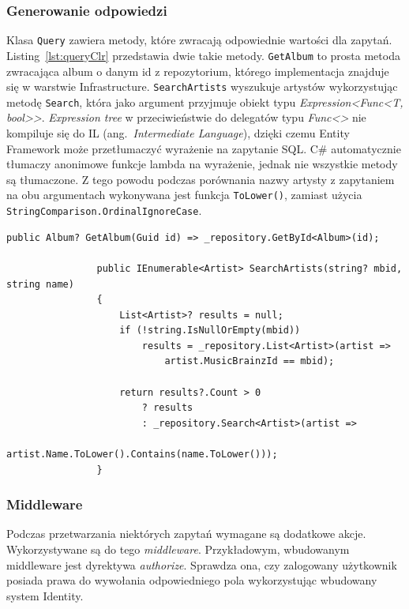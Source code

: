 		\subsubsection*{Generowanie odpowiedzi}
			Klasa \verb|Query| zawiera metody, które zwracają odpowiednie wartości dla zapytań.
			Listing~\ref{lst:queryClr} przedstawia dwie takie metody.
			\verb|GetAlbum| to prosta metoda zwracająca album o danym id z repozytorium, którego implementacja znajduje się w warstwie Infrastructure.
			\verb|SearchArtists| wyszukuje artystów wykorzystując metodę \verb|Search|, która jako argument przyjmuje obiekt typu \emph{Expression<Func<T, bool>>}.
			\emph{Expression tree} w przeciwieństwie do delegatów typu \emph{Func<>} nie kompiluje się do IL (ang.\ \emph{Intermediate Language}),
			dzięki czemu Entity Framework może przetłumaczyć wyrażenie na zapytanie SQL.
			C\# automatycznie tłumaczy anonimowe funkcje lambda na wyrażenie, jednak nie wszystkie metody są tłumaczone.
			Z tego powodu podczas porównania nazwy artysty z zapytaniem na obu argumentach wykonywana jest funkcja \verb|ToLower()|,
			zamiast użycia \verb|StringComparison.OrdinalIgnoreCase|.

			\begin{lstlisting}[label=lst:queryClr, caption=Fragment klasy Query, float=h]
				public Album? GetAlbum(Guid id) => _repository.GetById<Album>(id);

				public IEnumerable<Artist> SearchArtists(string? mbid, string name)
				{
					List<Artist>? results = null;
					if (!string.IsNullOrEmpty(mbid))
						results = _repository.List<Artist>(artist =>
							artist.MusicBrainzId == mbid);
		
					return results?.Count > 0
						? results
						: _repository.Search<Artist>(artist =>
							artist.Name.ToLower().Contains(name.ToLower()));
				}
			\end{lstlisting}

		\subsubsection*{Middleware}
			Podczas przetwarzania niektórych zapytań wymagane są dodatkowe akcje.
			Wykorzystywane są do tego \emph{middleware}.
			Przykładowym, wbudowanym middleware jest dyrektywa \emph{authorize}.
			Sprawdza ona, czy zalogowany użytkownik posiada prawa do wywołania odpowiedniego pola wykorzystując wbudowany system Identity.
			
